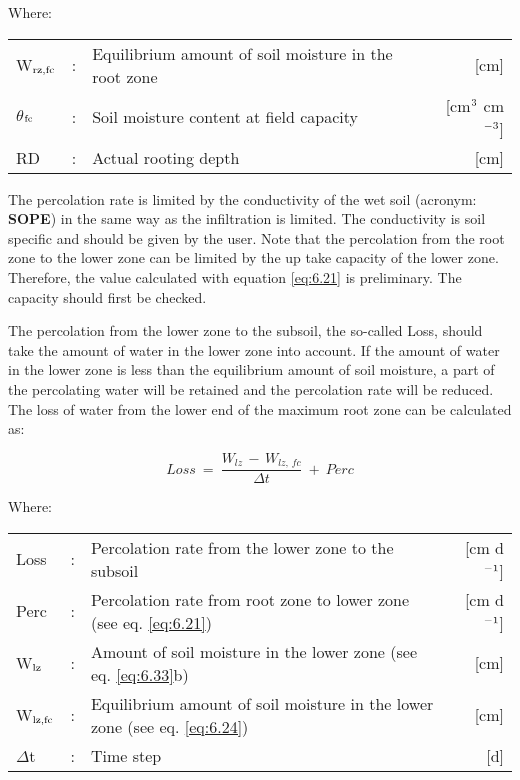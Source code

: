 Where:\\[5pt]
\begin{tabularx}{\textwidth}{llXr}
	W$_{{\rm rz,fc}}$ &:& Equilibrium amount of soil moisture in the root zone  & [cm]\\
	$\theta$$_{{\rm fc}}$ &:& Soil moisture content at field capacity  & 
	[cm$^{{\rm 3}}$ cm$^{{\rm -3}}$]\\
	RD &:& Actual rooting depth  & [cm]\\
\end{tabularx}

The percolation rate is limited by the conductivity of the wet soil (acronym: {\bf SOPE}) in the
same way as the infiltration is limited. The conductivity is soil specific and should be
given by the user. Note that the percolation from the root zone to the lower zone can be
limited by the up take capacity of the lower zone. Therefore, the value calculated with 
equation \ref{eq:6.21} is preliminary. The capacity should first be checked.

The percolation from the lower zone to the subsoil, the so-called Loss, should take the
amount of water in the lower zone into account. If the amount of water in the lower zone
is less than the equilibrium amount of soil moisture, a part of the percolating water will
be retained and the percolation rate will be reduced. The loss of water from the lower end
of the maximum root zone can be calculated as:

\begin{equation}
\label{eq:6.23}
Loss ~=~{\frac{W _{lz} \, -\, W _{lz,\, fc} }{\Delta t}} ~+~ Perc
\end{equation}

Where:\\[5pt]
\begin{tabularx}{\textwidth}{llXr}
	Loss &:& Percolation rate from the lower zone to the subsoil   & [cm d$^{{\rm -1}}$]\\
	Perc &:& Percolation rate from root zone to lower zone (see eq. \ref{eq:6.21})  & [cm d$^{{\rm -1}}$]\\
	W$_{{\rm lz}}$ &:& Amount of soil moisture in the lower zone (see eq. \ref{eq:6.33}b)  & [cm]\\
	W$_{{\rm lz,fc}}$ &:& Equilibrium amount of soil moisture in the
	lower zone (see eq. \ref{eq:6.24})  & [cm]\\
	$\Delta$t &:& Time step   & [d]\\
\end{tabularx}

